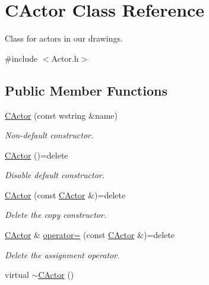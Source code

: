 \hypertarget{class_c_actor}{\section{C\+Actor Class Reference}
\label{class_c_actor}
}


Class for actors in our drawings.  




{\ttfamily \#include $<$Actor.\+h$>$}

\subsection*{Public Member Functions}
\begin{DoxyCompactItemize}
\item 
\hyperlink{class_c_actor_a26b1abd4ebd92942ae67af59abd9e4d2}{C\+Actor} (const wstring \&name)
\begin{DoxyCompactList}\small\item\em Non-\/default constructor. \end{DoxyCompactList}\item 
\hyperlink{class_c_actor_ae7683d5f0b3edc85dc47850fa71de40f}{C\+Actor} ()=delete
\begin{DoxyCompactList}\small\item\em Disable default constructor. \end{DoxyCompactList}\item 
\hypertarget{class_c_actor_a8af986ad4ec530967f942aaebd853632}{\hyperlink{class_c_actor_a8af986ad4ec530967f942aaebd853632}{C\+Actor} (const \hyperlink{class_c_actor}{C\+Actor} \&)=delete}\label{class_c_actor_a8af986ad4ec530967f942aaebd853632}

\begin{DoxyCompactList}\small\item\em Delete the copy constructor. \end{DoxyCompactList}\item 
\hypertarget{class_c_actor_ab872dc4722654170e427a18da1435e8b}{\hyperlink{class_c_actor}{C\+Actor} \& \hyperlink{class_c_actor_ab872dc4722654170e427a18da1435e8b}{operator=} (const \hyperlink{class_c_actor}{C\+Actor} \&)=delete}\label{class_c_actor_ab872dc4722654170e427a18da1435e8b}

\begin{DoxyCompactList}\small\item\em Delete the assignment operator. \end{DoxyCompactList}\item 
\hypertarget{class_c_actor_adca86a138fd9af275352336848ebad27}{virtual \hyperlink{class_c_actor_adca86a138fd9af275352336848ebad27}{$\sim$\+C\+Actor} ()}\label{class_c_actor_adca86a138fd9af275352336848ebad27}


\end{DoxyCompactItemize}
